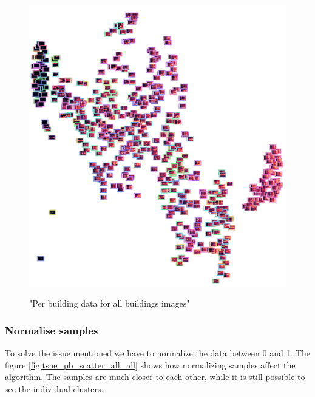 \begin{figure}[H]
	\centering
	\caption{"Per building data for all buildings images"}
	\includegraphics[width=.9\textwidth]{Figures/TSNE/TSNE_per_building/non_norm/img_scatter_allall.png}
	\label{fig:tsne_pb_img_scatter_allall}
\end{figure}

\subsubsection{Normalise samples}

To solve the issue mentioned we have to normalize the data between 0 and 1.
The figure \ref{fig:tsne_pb_scatter_all_all} shows how normalizing samples affect the algorithm.
The samples are much closer to each other, while it is still possible to see the individual clusters.


